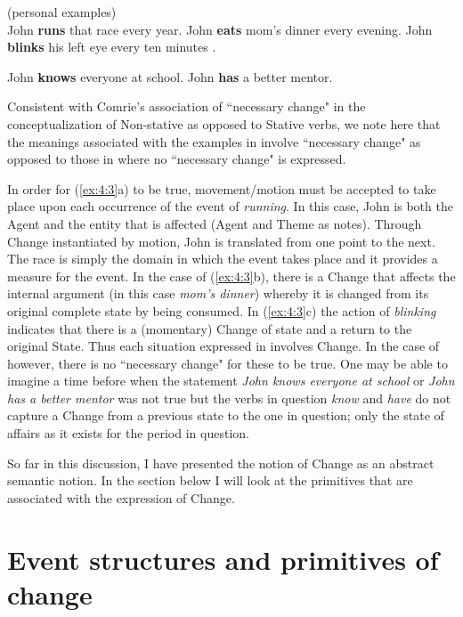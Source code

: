 \ea%
\label{ex:4:3}

(personal examples)\\
\ea John \textbf{runs} that race every year.
\ex John \textbf{eats} mom’s dinner every evening. 
\ex John \textbf{blinks} his left eye every ten minutes .\z \z


\ea%
\label{ex:4:4}
\ea John \textbf{knows} everyone at school. 
\ex John \textbf{has} a better mentor. \z \z


Consistent with Comrie’s association of ``necessary change" in the
conceptualization of Non-stative as opposed to Stative verbs, we note
here that the meanings associated with the examples in 
involve ``necessary change" as opposed to those in  where
no ``necessary change" is expressed.

In order for (\ref{ex:4:3}a) to be true, movement\slash motion must be
accepted to take place upon each occurrence of the event of \textit{running}.
In this case, John is both the Agent and the entity that is affected
(Agent and Theme as \citet[28]{Pustejovsky1988} notes).  Through Change
instantiated by motion, John is translated from one point to the next.
The race is simply the domain in which the event takes place and it
provides a measure for the event.  In the case of (\ref{ex:4:3}b),
there is a Change that affects the internal argument (in this case
\textit{mom’s dinner}) whereby it is changed from its original complete state
by being consumed.  In (\ref{ex:4:3}c) the action of \textit{blinking}
indicates that there is a (momentary) Change of state and a return to
the original State.  Thus each situation expressed in 
involves Change.  In the case of  however, there is no
``necessary change" for these to be true.  One may be able to imagine a
time before when the statement \textit{John knows everyone at school} or
\textit{John has a better mentor} was not true but the verbs in question
\textit{know} and \textit{have} do not capture a Change from a previous state to the
one in question; only the state of affairs as it exists for the period
in question.

So far in this discussion, I have presented the notion of Change as an
abstract semantic notion.  In the section below I will look at the
primitives that are associated with the expression of Change.

\section{Event structures and primitives of change}\label{sec:4.2}

